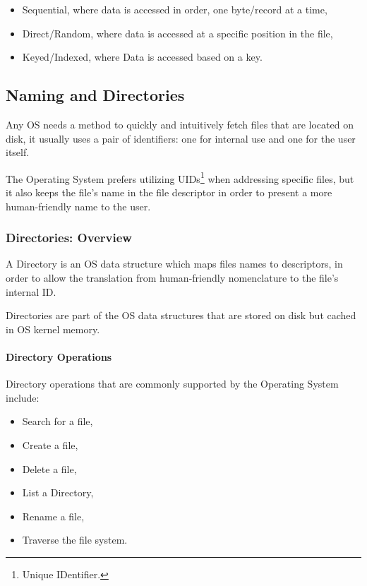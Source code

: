 \documentclass[openright, twoside]{report}
\theoremstyle{definition}
\theoremstyle{example}
\begin{document}
\begin{itemize}
	\item Sequential, where data is accessed in order, one byte/record at a time,
	\item Direct/Random, where data is accessed at a specific position in the file,
	\item Keyed/Indexed, where Data is accessed based on a key.
\end{itemize}

\subsection{Naming and Directories}
Any OS needs a method to quickly and intuitively fetch files that are located 
on disk, it usually uses a pair of identifiers: one for internal use and 
one for the user itself.

The Operating System prefers utilizing UIDs\footnote{Unique IDentifier.} when 
addressing specific files, but it also keeps the file's name in the file descriptor
in order to present a more human-friendly name to the user.

\subsubsection{Directories: Overview}
A Directory is an OS data structure which maps files names to descriptors, in 
order to allow the translation from human-friendly nomenclature to the file's 
internal ID.

\begin{center}
	Directories are part of the OS data structures that are stored on disk but 
	cached in OS kernel memory.
\end{center}

\paragraph{Directory Operations}
Directory operations that are commonly supported by the Operating System include:

\begin{multicols}{2}
	\begin{itemize}
		\item Search for a file,
		\item Create a file,
		\item Delete a file,
		\item List a Directory,
		\item Rename a file,
		\item Traverse the file system.
	\end{itemize}
\end{multicols}
\end{document}
